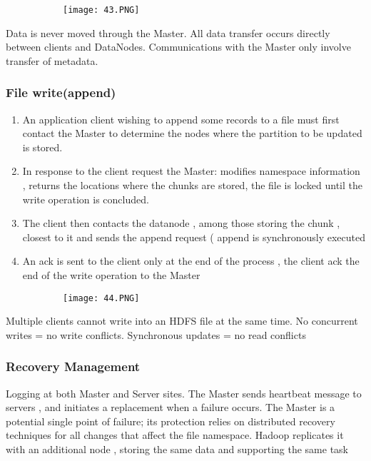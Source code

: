 \documentclass{article}
\begin{document}
\begin{figure}[ht!]
  \centering
  \begin{subfigure}[b]{0.50\linewidth}
    \texttt{[image: 43.PNG]}
  \end{subfigure}
\end{figure}



Data is never moved through the Master. All data transfer occurs directly between clients and DataNodes. Communications with the Master only involve transfer of metadata.

\subsubsection{File write(append)}
\begin{enumerate}
    \item An application client wishing to append some records to a file must first contact the Master to determine the nodes where the partition to be updated is stored.
    \item In response to the client request the Master: modifies namespace information , returns the locations where the chunks are stored, the file is locked until the write operation is concluded.
    \item The client then contacts the datanode , among those storing the chunk , closest to it and sends the append request ( append is synchronously executed
    \item An ack is sent to the client only at the end of the process , the client ack the end of the write operation to the Master
\end{enumerate}


\begin{figure}[ht!]
  \centering
  \begin{subfigure}[b]{0.50\linewidth}
    \texttt{[image: 44.PNG]}
  \end{subfigure}
\end{figure}

Multiple clients cannot write into an HDFS file at the same time. No concurrent writes = no write conflicts. Synchronous updates = no read conflicts

\subsubsection{Recovery Management}

Logging at both Master and Server sites. The Master sends heartbeat message to servers , and initiates a replacement when a failure occurs.
The Master is a potential single point of failure; its protection relies on distributed recovery techniques for all changes that affect the file namespace. Hadoop replicates it with an additional node , storing the same data and supporting the same task
\end{document}
